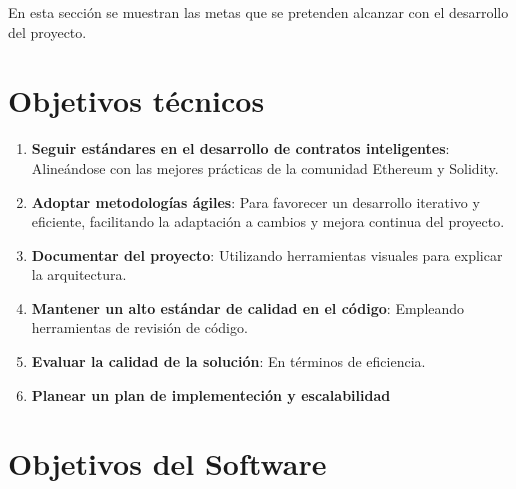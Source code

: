 
En esta sección se muestran las metas que se pretenden alcanzar con el desarrollo del proyecto.

\section*{Objetivos técnicos}

\begin{enumerate}

\item \textbf{Seguir estándares en el desarrollo de contratos inteligentes}: Alineándose con las mejores prácticas de la comunidad Ethereum y Solidity. 

\item \textbf{Adoptar metodologías ágiles}: Para favorecer un desarrollo iterativo y eficiente, facilitando la adaptación a cambios y mejora continua del proyecto.

\item \textbf{Documentar del proyecto}: Utilizando herramientas visuales para explicar la arquitectura. 

\item \textbf{Mantener un alto estándar de calidad en el código}: Empleando herramientas de revisión de código.


\item \textbf{Evaluar la calidad de la solución}: En términos de eficiencia.

\item \textbf{Planear un plan de implementeción y escalabilidad}

\end{enumerate}


\section*{Objetivos del Software}

